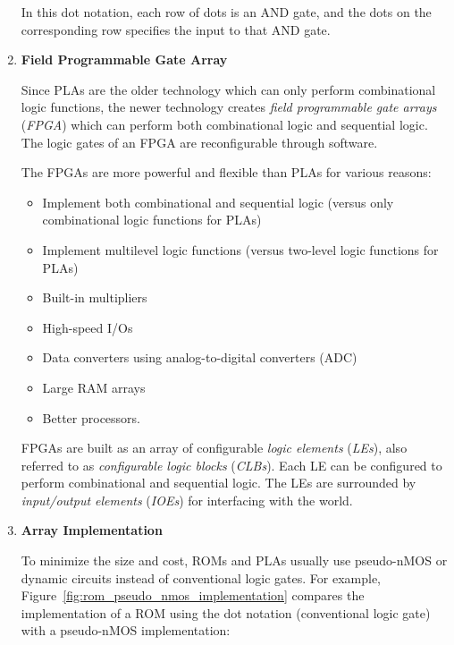 \documentclass[12pt]{article}
\numberwithin{figure}{subsection}
\numberwithin{table}{subsection}
\numberwithin{equation}{subsection}
\begin{document}
\begin{enumerate}
  In this dot notation, each row of dots is an AND gate, and the dots on the corresponding row specifies the input to that AND gate.

  \item \textbf{Field Programmable Gate Array}

  Since PLAs are the older technology which can only perform combinational logic functions, the newer technology creates \textit{field programmable gate arrays} (\textit{FPGA}) which can perform both combinational logic and sequential logic. The logic gates of an FPGA are reconfigurable through software.

  The FPGAs are more powerful and flexible than PLAs for various reasons:

  \begin{itemize}
    \item Implement both combinational and sequential logic (versus only combinational logic functions for PLAs)
    \item Implement multilevel logic functions (versus two-level logic functions for PLAs)
    \item Built-in multipliers
    \item High-speed I/Os
    \item Data converters using analog-to-digital converters (ADC)
    \item Large RAM arrays
    \item Better processors.
  \end{itemize}

  FPGAs are built as an array of configurable \textit{logic elements} (\textit{LEs}), also referred to as \textit{configurable logic blocks} (\textit{CLBs}). Each LE can be configured to perform combinational and sequential logic. The LEs are surrounded by \textit{input/output elements} (\textit{IOEs}) for interfacing with the world.

  \item \textbf{Array Implementation}

  To minimize the size and cost, ROMs and PLAs usually use pseudo-nMOS or dynamic circuits instead of conventional logic gates. For example, Figure~\ref{fig:rom_pseudo_nmos_implementation} compares the implementation of a ROM using the dot notation (conventional logic gate) with a pseudo-nMOS implementation:

  \newpage


\end{enumerate}
\end{document}
